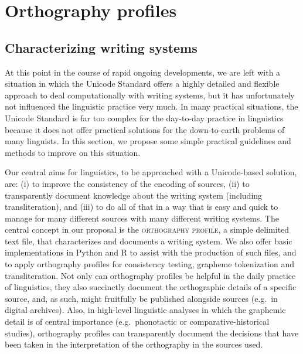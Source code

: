 \chapter{Orthography profiles}
\label{orthography-profiles}

\section{Characterizing writing systems}
\label{characterizing-writing-systems}

At this point in the course of rapid ongoing developments, we are left with a
situation in which the Unicode Standard offers a highly detailed and flexible
approach to deal computationally with writing systems, but it has unfortunately
not influenced the linguistic practice very much. In many practical situations,
the Unicode Standard is far too complex for the day-to-day practice in
linguistics because it does not offer practical solutions for the down-to-earth
problems of many linguists. In this section, we propose some simple practical
guidelines and methods to improve on this situation.

Our central aims for linguistics, to be approached with a Unicode-based
solution, are: (i) to improve the consistency of the encoding of sources, (ii)
to transparently document knowledge about the writing system (including
transliteration), and (iii) to do all of that in a way that is easy and quick to
manage for many different sources with many different writing systems. The
central concept in our proposal is the \textsc{orthography profile}, a simple
delimited text file, that characterizes and documents a writing system.
We also offer basic implementations in Python and R to assist with the
production of such files, and to apply orthography profiles for consistency
testing, grapheme tokenization and transliteration. Not only can orthography
profiles be helpful in the daily practice of linguistics, they also succinctly
document the orthographic details of a specific source, and, as such, might
fruitfully be published alongside sources (e.g.~in digital archives). Also, in
high-level linguistic analyses in which the graphemic detail is of central
importance (e.g.~phonotactic or comparative-historical studies), orthography
profiles can transparently document the decisions that have been taken in the
interpretation of the orthography in the sources used.

